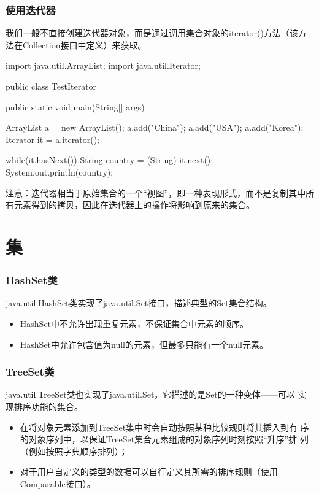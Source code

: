 \begin{frame}[fragile] %
  \frametitle{使用迭代器}

  我们一般不直接创建迭代器对象，而是通过调用集合对象的iterator()方法（该方法在Collection接口中定义）来获取。


  \begin{javaCode}
    import java.util.ArrayList;
    import java.util.Iterator;

    public class TestIterator {
      public static void main(String[] args) {
        ArrayList a = new ArrayList();
        a.add("China");
        a.add("USA");
        a.add("Korea");
        Iterator it = a.iterator();
        
        while(it.hasNext()) {
          String country = (String) it.next();
          System.out.println(country);
        }
      }
    }
  \end{javaCode}
  {\kai\Red 注意：迭代器相当于原始集合的一个“视图”，即一种表现形式，而不是复制其中所有元素得到的拷贝，因此在迭代器上的操作将影响到原来的集合。}
\end{frame}

\section{集}

\begin{frame}[fragile] %
  \frametitle{HashSet类}

  java.util.HashSet类实现了java.util.Set接口，描述典型的Set集合结构。

  \begin{itemize}
  \item HashSet中不允许出现重复元素，不保证集合中元素的顺序。
  \item HashSet中允许包含值为null的元素，但最多只能有一个null元素。
  \end{itemize}
\end{frame}

\begin{frame}[fragile] %
  \frametitle{TreeSet类}

  java.util.TreeSet类也实现了java.util.Set，它描述的是Set的一种变体——可以
  实现排序功能的集合。

  \begin{itemize}\kai
  \item 在将对象元素添加到TreeSet集中时会自动按照某种比较规则将其插入到有
    序的对象序列中，以保证TreeSet集合元素组成的对象序列时刻按照“升序”排
    列（例如按照字典顺序排列）；
  \item 对于用户自定义的类型的数据可以自行定义其所需的排序规则（使用Comparable接口）。
  \end{itemize}
\end{frame}

